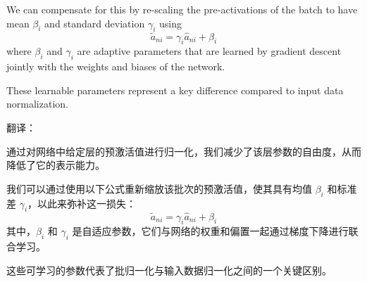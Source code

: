 \documentclass{article}
\begin{document}
We can compensate for this by re-scaling the pre-activations of the batch to have mean $\beta_i$ and standard deviation $\gamma_i$ using
\begin{equation}
    \widetilde{a}_{ni} = \gamma_i \widehat{a}_{ni} + \beta_i \tag{7.55}
\end{equation}
where $\beta_i$ and $\gamma_i$ are adaptive parameters that are learned by gradient descent jointly with the weights and biases of the network. 

These learnable parameters represent a key difference compared to input data normalization.

{\color{red}
翻译：

通过对网络中给定层的预激活值进行归一化，我们减少了该层参数的自由度，从而降低了它的表示能力。

我们可以通过使用以下公式重新缩放该批次的预激活值，使其具有均值 $\beta_i$ 和标准差 $\gamma_i$，以此来弥补这一损失：
\begin{equation}
    \widetilde{a}_{ni} = \gamma_i \widehat{a}_{ni} + \beta_i \tag{7.55}
\end{equation}
其中，$\beta_i$ 和 $\gamma_i$ 是自适应参数，它们与网络的权重和偏置一起通过梯度下降进行联合学习。

这些可学习的参数代表了批归一化与输入数据归一化之间的一个关键区别。
}
\end{document}
